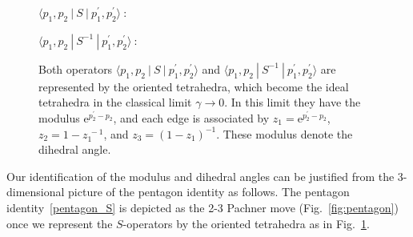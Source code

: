 \documentclass[12pt]{article}
\numberwithin{equation}{section}
\begin{document}
\begin{figure}[htbp]
  \begin{center}
    \parbox{2cm}
    {$\langle p_1, p_2 \  | \ S \  | \ p_1^\prime , p_2^\prime \rangle ~:~$}
%
    \begin{psfrags}
%
    \end{psfrags}
    \hspace{20mm}
    \parbox{2cm}
    {$\langle p_1, p_2 \  | \ S^{-1} \  | \  p_1^\prime , p_2^\prime \rangle ~:~$}
%
    \begin{psfrags}
%
%
    \end{psfrags}
    \caption{Both operators
      $\langle p_1, p_2 \  | \ S \  | \  p_1^\prime , p_2^\prime \rangle$
      and
      $\langle p_1, p_2 \  | \  S^{-1} \  | \  p_1^\prime , p_2^\prime \rangle$
      are represented by the oriented tetrahedra,
      which become the ideal tetrahedra in the classical limit
      $\gamma  \to 0$.
      In this limit they  have  the modulus
      $\mathrm{e}^{p_2^\prime - p_2}$, and
      each edge is associated  by
      $z_1=\mathrm{e}^{p_2^\prime -p_2}$,
      $z_2=1-z_1^{~-1}$, and
      $z_3=(1-z_1)^{-1}$.
      These modulus denote the dihedral angle.
      }
    \label{fig:S_operator}
  \end{center}
\end{figure}

Our  identification
of the modulus and dihedral angles
can be justified  from the 3-dimensional picture of the
pentagon identity as follows.
The pentagon identity~\eqref{pentagon_S}  is depicted as
the 2-3 Pachner move
(Fig.~\ref{fig:pentagon})
once we represent the $S$-operators by the oriented tetrahedra as in
Fig.~\ref{fig:S_operator}.
\end{document}

